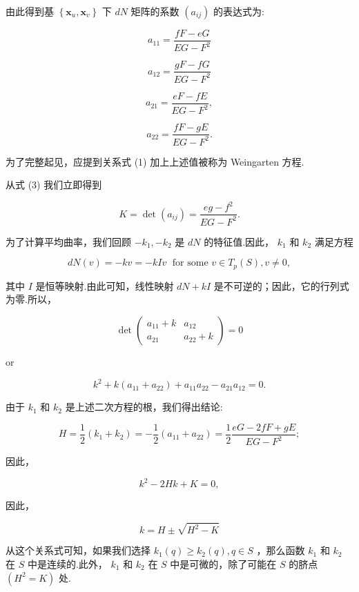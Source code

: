 由此得到基 \(\left\{  {{\mathbf{x}}_{u},{\mathbf{x}}_{v}}\right\}\) 下 \({dN}\) 矩阵的系数 \(\left( {a}_{ij}\right)\) 的表达式为:

\[
{a}_{11} = \frac{{fF} - {eG}}{{EG} - {F}^{2}}
\]

\[
{a}_{12} = \frac{{gF} - {fG}}{{EG} - {F}^{2}}
\]

\[
{a}_{21} = \frac{{eF} - {fE}}{{EG} - {F}^{2}},
\]

\[
{a}_{22} = \frac{{fF} - {gE}}{{EG} - {F}^{2}}.
\]

为了完整起见，应提到关系式 (1) 加上上述值被称为 Weingarten 方程.

从式 (3) 我们立即得到

\[
K = \det \left( {a}_{ij}\right)  = \frac{{eg} - {f}^{2}}{{EG} - {F}^{2}}. \tag{4}
\]

为了计算平均曲率，我们回顾 \(- {k}_{1}, - {k}_{2}\) 是 \({dN}\) 的特征值.因此， \({k}_{1}\) 和 \({k}_{2}\) 满足方程

\[
{dN}\left( v\right)  =  - {kv} =  - {kIv}\;\text{ for some }v \in  {T}_{p}\left( S\right) ,v \neq  0,
\]

其中 \(I\) 是恒等映射.由此可知，线性映射 \({dN} + {kI}\) 是不可逆的；因此，它的行列式为零.所以，

\[
\det \left( \begin{array}{ll} {a}_{11} + k & {a}_{12} \\  {a}_{21} & {a}_{22} + k \end{array}\right)  = 0
\]

or

\[
{k}^{2} + k\left( {{a}_{11} + {a}_{22}}\right)  + {a}_{11}{a}_{22} - {a}_{21}{a}_{12} = 0.
\]

由于 \({k}_{1}\) 和 \({k}_{2}\) 是上述二次方程的根，我们得出结论:

\[
H = \frac{1}{2}\left( {{k}_{1} + {k}_{2}}\right)  =  - \frac{1}{2}\left( {{a}_{11} + {a}_{22}}\right)  = \frac{1}{2}\frac{{eG} - {2fF} + {gE}}{{EG} - {F}^{2}}; \tag{5}
\]

因此，

\[
{k}^{2} - {2Hk} + K = 0,
\]

因此，

\[
k = H \pm  \sqrt{{H}^{2} - K} \tag{6}
\]

从这个关系式可知，如果我们选择 \({k}_{1}\left( q\right)  \geq  {k}_{2}\left( q\right) ,q \in  S\) ，那么函数 \({k}_{1}\) 和 \({k}_{2}\) 在 \(S\) 中是连续的.此外， \({k}_{1}\) 和 \({k}_{2}\) 在 \(S\) 中是可微的，除了可能在 \(S\) 的脐点 \(\left( {{H}^{2} = K}\right)\) 处.


